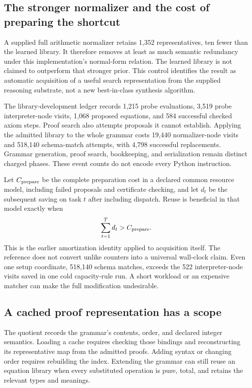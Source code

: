 \documentclass[11pt,letterpaper]{article}
\theoremstyle{plain}
\theoremstyle{definition}
\begin{document}
\subsection{The stronger normalizer and the cost of preparing the shortcut}
A supplied full arithmetic normalizer retains 1,352 representatives, ten fewer than the learned library. It therefore removes at least as much semantic redundancy under this implementation's normal-form relation. The learned library is not claimed to outperform that stronger prior. This control identifies the result as automatic acquisition of a useful search representation from the supplied reasoning substrate, not a new best-in-class synthesis algorithm.

The library-development ledger records 1,215 probe evaluations, 3,519 probe interpreter-node visits, 1,068 proposed equations, and 584 successful checked axiom steps. Proof search also attempts proposals it cannot establish. Applying the admitted library to the whole grammar costs 19,440 normalizer-node visits and 518,140 schema-match attempts, with 4,798 successful replacements. Grammar generation, proof search, bookkeeping, and serialization remain distinct charged phases. These event counts do not encode every Python instruction.

Let $C_{\rm prepare}$ be the complete preparation cost in a declared common resource model, including failed proposals and certificate checking, and let $d_t$ be the subsequent saving on task $t$ after including dispatch. Reuse is beneficial in that model exactly when
\[
 \sum_{t=1}^{T}d_t>C_{\rm prepare}.
\]
This is the earlier amortization identity applied to acquisition itself. The reference does not convert unlike counters into a universal wall-clock claim. Even one setup coordinate, 518,140 schema matches, exceeds the 522 interpreter-node visits saved in one cold capacity-rule run. A short workload or an expensive matcher can make the full modification undesirable.

\subsection{A cached proof representation has a scope}
The quotient records the grammar's contents, order, and declared integer semantics. Loading a cache requires checking those bindings and reconstructing its representative map from the admitted proofs. Adding syntax or changing order requires rebuilding the index. Extending the grammar can still reuse an equation library when every substituted operation is pure, total, and retains the relevant types and meanings.
\end{document}
